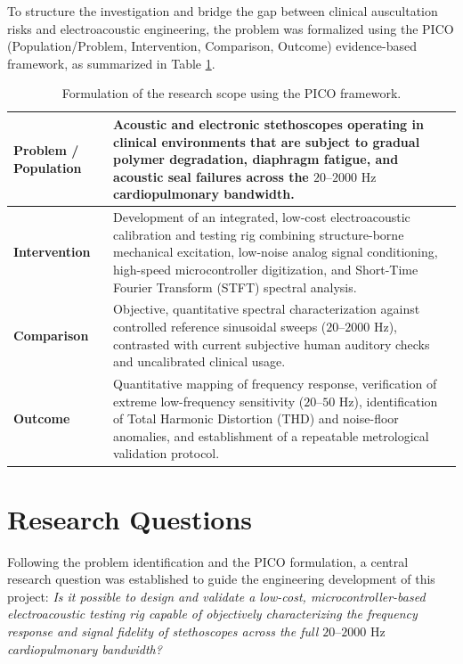 To structure the investigation and bridge the gap between clinical auscultation risks and electroacoustic engineering, the problem was formalized using the PICO (Population/Problem, Intervention, Comparison, Outcome) evidence-based framework, as summarized in Table \ref{tab:pico_framework}.

\begin{table}[htbp]
\centering
\caption{Formulation of the research scope using the PICO framework.}
\label{tab:pico_framework}
\begin{tabular}{p{3.2cm} p{10.5cm}}
\hline
\textbf{Problem / Population} & Acoustic and electronic stethoscopes operating in clinical environments that are subject to gradual polymer degradation, diaphragm fatigue, and acoustic seal failures across the $20\text{--}2000\text{ Hz}$ cardiopulmonary bandwidth. \\
\hline
\textbf{Intervention} & Development of an integrated, low-cost electroacoustic calibration and testing rig combining structure-borne mechanical excitation, low-noise analog signal conditioning, high-speed microcontroller digitization, and Short-Time Fourier Transform (STFT) spectral analysis. \\
\hline
\textbf{Comparison} & Objective, quantitative spectral characterization against controlled reference sinusoidal sweeps ($20\text{--}2000\text{ Hz}$), contrasted with current subjective human auditory checks and uncalibrated clinical usage. \\
\hline
\textbf{Outcome} & Quantitative mapping of frequency response, verification of extreme low-frequency sensitivity ($20\text{--}50\text{ Hz}$), identification of Total Harmonic Distortion (THD) and noise-floor anomalies, and establishment of a repeatable metrological validation protocol. \\
\hline
\end{tabular}
\end{table}

\section{Research Questions}

Following the problem identification and the PICO formulation, a central research question was established to guide the engineering development of this project: \textit{Is it possible to design and validate a low-cost, microcontroller-based electroacoustic testing rig capable of objectively characterizing the frequency response and signal fidelity of stethoscopes across the full $20\text{--}2000\text{ Hz}$ cardiopulmonary bandwidth?}

